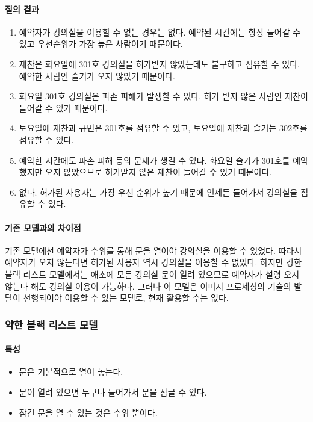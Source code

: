 \documentclass[11pt,a4paper]{article}
\begin{document}
\paragraph{질의 결과}
\begin{enumerate}
\item 예약자가 강의실을 이용할 수 없는 경우는 없다. 예약된 시간에는 항상 들어갈 수 있고 우선순위가 가장 높은 사람이기 때문이다.
\item 재찬은 화요일에 301호 강의실을 허가받지 않았는데도 불구하고 점유할 수 있다. 예약한 사람인 슬기가 오지 않았기 때문이다.
\item 화요일 301호 강의실은 파손 피해가 발생할 수 있다. 허가 받지 않은 사람인 재찬이 들어갈 수 있기 때문이다.
\item 토요일에 재찬과 규민은 301호를 점유할 수 있고, 토요일에 재찬과 슬기는 302호를 점유할 수 있다.
\item 예약한 시간에도 파손 피해 등의 문제가 생길 수 있다. 화요일 슬기가 301호를 예약했지만 오지 않았으므로 허가받지 않은 재찬이 들어갈 수 있기 때문이다.
\item 없다. 허가된 사용자는 가장 우선 순위가 높기 때문에 언제든 들어가서 강의실을 점유할 수 있다.
\end{enumerate}

\paragraph{기존 모델과의 차이점}
\hfill\break
기존 모델에선 예약자가 수위를 통해 문을 열어야 강의실을 이용할 수 있었다.
따라서 예약자가 오지 않는다면 허가된 사용자 역시 강의실을 이용할 수 없었다.
하지만 강한 블랙 리스트 모델에서는 애초에 모든 강의실 문이 열려 있으므로
예약자가 설령 오지 않는다 해도 강의실 이용이 가능하다.
그러나 이 모델은 이미지 프로세싱의 기술의 발달이 선행되어야 이용할 수 있는 모델로, 현재 활용할 수는 없다.

\subsubsection{약한 블랙 리스트 모델}

\paragraph{특성}
\begin{itemize}
\item 문은 기본적으로 열어 놓는다.
\item 문이 열려 있으면 누구나 들어가서 문을 잠글 수 있다.
\item 잠긴 문을 열 수 있는 것은 수위 뿐이다.
\end{itemize}
\end{document}

